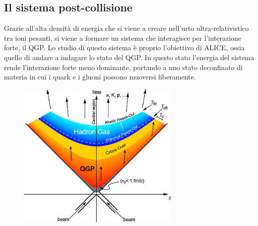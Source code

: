 \subsection{Il sistema post-collisione}
Grazie all'alta densità di energia che si viene a creare nell'urto ultra-relativistico tra ioni pesanti, si viene a formare un sistema che interagisce per l'interazione forte, il QGP.
Lo studio di questo sistema è proprio l'obiettivo di ALICE, ossia quello di andare a indagare lo stato del QGP.
In questo stato l'energia del sistema rende l'interazione forte meno dominante, portando a uno stato deconfinato di materia in cui i quark e i gluoni possono muoversi liberamente.
\begin{figure}[htb]
    \centering
    \includegraphics[width=0.7\textwidth]{image/1-alice/Colour-online-Space-time-diagram-of-a-heavy-ion-collision-of-two-nuclei-colliding-at.jpg}
    \label{fig:qgp}
\end{figure}

